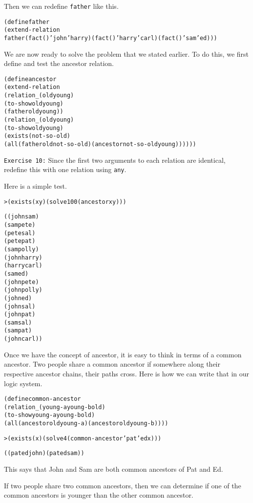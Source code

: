 \noindent
Then we can redefine \texttt{father} like this.

\begin{alltt}
(define father
  (extend-relation 
    father (fact () 'john 'harry) (fact () 'harry 'carl) (fact () 'sam 'ed)))
\end{alltt}

We are now ready to solve the problem that we stated earlier.  To do
this, we first define and test the ancestor relation.

\begin{alltt}
(define ancestor
  (extend-relation
    (relation _ (old young)
      (to-show old young)
      (father old young))
    (relation _ (old young)
      (to-show old young)
      (exists (not-so-old)
        (all (father old not-so-old) (ancestor not-so-old young))))))
\end{alltt}

\texttt{Exercise 10:} Since the first two arguments to each relation
are identical, redefine this with one relation using \texttt{any}.

Here is a simple test.

\begin{alltt}
> (exists (x y) (solve 100 (ancestor x y)))

((john sam)
 (sam pete)
 (pete sal)
 (pete pat)
 (sam polly)
 (john harry)
 (harry carl)
 (sam ed)
 (john pete)
 (john polly)
 (john ed)
 (john sal)
 (john pat)
 (sam sal)
 (sam pat)
 (john carl))
\end{alltt}

Once we have the concept of ancestor, it is easy to think in terms of
a common ancestor.  Two people share a common ancestor if somewhere
along their respective ancestor chains, their paths cross.  Here is
how we can write that in our logic system.

\begin{alltt}
(define common-ancestor
  (relation _ (young-a young-b old)
    (to-show young-a young-b old)
    (all (ancestor old young-a) (ancestor old young-b))))

> (exists (x) (solve 4 (common-ancestor 'pat 'ed x)))

((pat ed john) (pat ed sam))
\end{alltt}

\noindent
This says that John and Sam are both common
ancestors of Pat and Ed.

If two people share two common ancestors, then we can determine if one
of the common ancestors is younger than the other common ancestor.

